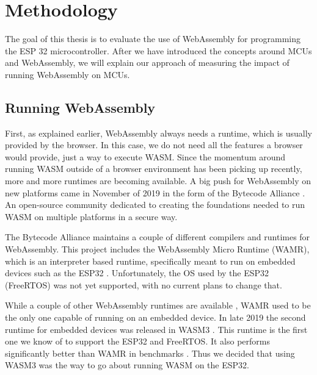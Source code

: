
\chapter{Methodology}\label{chapter:methodology}

The goal of this thesis is to evaluate the use of WebAssembly for programming the ESP 32 microcontroller. After we have introduced the concepts around MCUs and WebAssembly, we will explain our approach of measuring the impact of running WebAssembly on MCUs.

\section{Running WebAssembly}

First, as explained earlier, WebAssembly always needs a runtime, which is usually provided by the browser. In this case, we do not need all the features a browser would provide, just a way to execute WASM. Since the momentum around running WASM outside of a browser environment has been picking up recently, more and more runtimes are becoming available. A big push for WebAssembly on new platforms came in November of 2019 in the form of the Bytecode Alliance \autocite{noauthor_bytecode_nodate}. An open-source community dedicated to creating the foundations needed to run WASM on multiple platforms in a secure way.

The Bytecode Alliance maintains a couple of different compilers and runtimes for WebAssembly. This project includes the WebAssembly Micro Runtime (WAMR), which is an interpreter based runtime, specifically meant to run on embedded devices such as the ESP32 \autocite{noauthor_bytecodealliancewasm-micro-runtime_2020}. Unfortunately, the OS used by the ESP32 (FreeRTOS) was not yet supported, with no current plans to change that.

While a couple of other WebAssembly runtimes are available \autocite{akinyemi_appcypherawesome-wasm-runtimes_2020}, WAMR used to be the only one capable of running on an embedded device. In late 2019 the second runtime for embedded devices was released in WASM3 \autocite{noauthor_wasm3wasm3_2020}. This runtime is the first one we know of to support the ESP32 and FreeRTOS. It also performs significantly better than WAMR in benchmarks \autocite{shymanskyy_wasm3_2020}. Thus we decided that using WASM3 was the way to go about running WASM on the ESP32.

